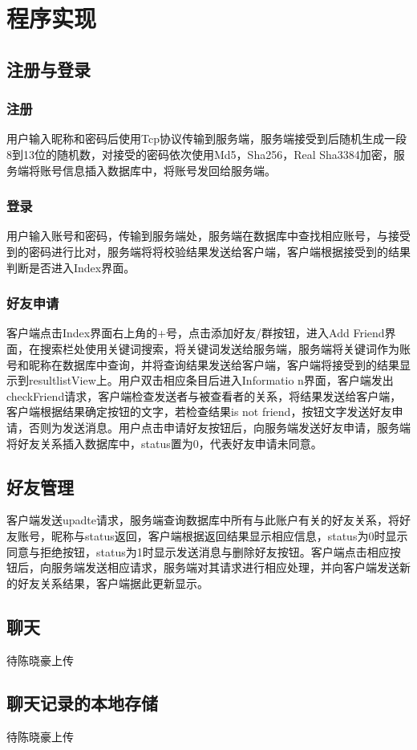 \documentclass[UTF8]{ctexart}
\begin{document}
\section{程序实现}
\subsection{注册与登录}
\subsubsection{注册}
用户输入昵称和密码后使用Tcp协议传输到服务端，服务端接受到后随机生成一段8到13位的随机数，对接受的密码依次使用Md5，Sha256，Real
Sha3\textunderscore384加密，服务端将账号信息插入数据库中，将账号发回给服务端。
\subsubsection{登录}
用户输入账号和密码，传输到服务端处，服务端在数据库中查找相应账号，与接受到的密码进行比对，服务端将将校验结果发送给客户端，客户端根据接受到的结果判断是否进入Index界面。
\subsubsection{好友申请}
客户端点击Index界面右上角的+号，点击添加好友/群按钮，进入Add
Friend界面，在搜索栏处使用关键词搜索，将关键词发送给服务端，服务端将关键词作为账号和昵称在数据库中查询，并将查询结果发送给客户端，客户端将接受到的结果显示到resultlistView上。用户双击相应条目后进入Informatio
n界面，客户端发出checkFriend请求，客户端检查发送者与被查看者的关系，将结果发送给客户端，客户端根据结果确定按钮的文字，若检查结果is not friend，按钮文字发送好友申请，否则为发送消息。用户点击申请好友按钮后，向服务端发送好友申请，服务端将好友关系插入数据库中，status置为0，代表好友申请未同意。
\subsection{好友管理}
客户端发送upadte请求，服务端查询数据库中所有与此账户有关的好友关系，将好友账号，昵称与status返回，客户端根据返回结果显示相应信息，status为0时显示同意与拒绝按钮，status为1时显示发送消息与删除好友按钮。客户端点击相应按钮后，向服务端发送相应请求，服务端对其请求进行相应处理，并向客户端发送新的好友关系结果，客户端据此更新显示。
\subsection{聊天}
待陈晓豪上传
\subsection{聊天记录的本地存储}
待陈晓豪上传
\end{document}
